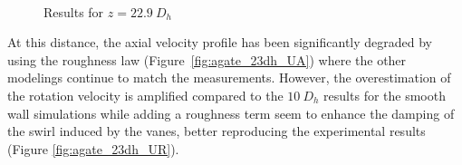 \begin{figure}[!h]
\centering
{}
\\
\caption{Results for $z=22.9\ D_{h}$}
\label{fig:agate_cfd_23dh}
\end{figure}


\npar

At this distance, the axial velocity profile has been significantly degraded by using the roughness law (Figure\ \ref{fig:agate_23dh_UA}) where the other modelings continue to match the measurements. However, the overestimation of the rotation velocity is amplified compared to the $10\ D_{h}$ results for the smooth wall simulations while adding a roughness term seem to enhance the damping of the swirl induced by the vanes, better reproducing the experimental results (Figure \ref{fig:agate_23dh_UR}).

